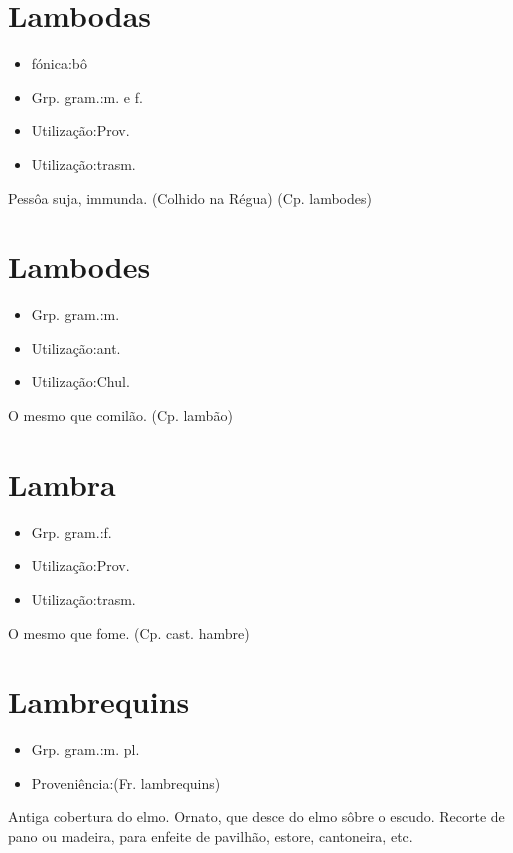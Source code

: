 \section{Lambodas}
\begin{itemize}
\item {fónica:bô}
\end{itemize}
\begin{itemize}
\item {Grp. gram.:m.  e  f.}
\end{itemize}
\begin{itemize}
\item {Utilização:Prov.}
\end{itemize}
\begin{itemize}
\item {Utilização:trasm.}
\end{itemize}
Pessôa suja, immunda. (Colhido na Régua)
(Cp. \textunderscore lambodes\textunderscore )
\section{Lambodes}
\begin{itemize}
\item {Grp. gram.:m.}
\end{itemize}
\begin{itemize}
\item {Utilização:ant.}
\end{itemize}
\begin{itemize}
\item {Utilização:Chul.}
\end{itemize}
O mesmo que \textunderscore comilão\textunderscore .
(Cp. \textunderscore lambão\textunderscore )
\section{Lambra}
\begin{itemize}
\item {Grp. gram.:f.}
\end{itemize}
\begin{itemize}
\item {Utilização:Prov.}
\end{itemize}
\begin{itemize}
\item {Utilização:trasm.}
\end{itemize}
O mesmo que \textunderscore fome\textunderscore .
(Cp. cast. \textunderscore hambre\textunderscore )
\section{Lambrequins}
\begin{itemize}
\item {Grp. gram.:m. pl.}
\end{itemize}
\begin{itemize}
\item {Proveniência:(Fr. \textunderscore lambrequins\textunderscore )}
\end{itemize}
Antiga cobertura do elmo.
Ornato, que desce do elmo sôbre o escudo.
Recorte de pano ou madeira, para enfeite de pavilhão, estore, cantoneira, etc.
